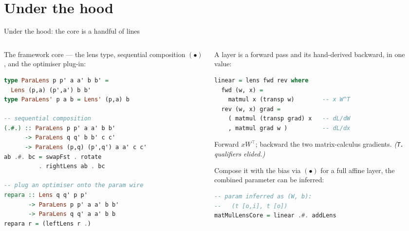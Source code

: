 \documentclass[aspectratio=169,11pt]{beamer}
\begin{document}
\section{Under the hood}

\begin{frame}[fragile]{Under the hood: the core is a handful of lines}
  \begin{columns}[T]
    \begin{column}{0.53\textwidth}
      \footnotesize The framework core --- the lens type, sequential composition $(\bullet)$, and the
      optimiser plug-in:
\begin{lstlisting}[language=hs,basicstyle=\ttfamily\scriptsize]
type ParaLens p p' a a' b b' = 
  Lens (p,a) (p',a') b b'
type ParaLens' p a b = Lens' (p,a) b

-- sequential composition
(.#.) :: ParaLens p p' a a' b b'
      -> ParaLens q q' b b' c c'
      -> ParaLens (p,q) (p',q') a a' c c'
ab .#. bc = swapFst . rotate
          . rightLens ab . bc

-- plug an optimiser onto the param wire
repara :: Lens q q' p p' 
       -> ParaLens p p' a a' b b' 
       -> ParaLens q q' a a' b b
repara r = (leftLens r .)
\end{lstlisting}
    \end{column}
    \begin{column}{0.47\textwidth}
      \footnotesize A layer is a forward pass and its hand-derived backward, in one value:
\begin{lstlisting}[language=hs,basicstyle=\ttfamily\scriptsize]
linear = lens fwd rev where
  fwd (w, x) =
    matmul x (transp w)        -- x W^T
  rev (w, x) grad =
    ( matmul (transp grad) x   -- dL/dW
    , matmul grad w )          -- dL/dx
\end{lstlisting}
      \scriptsize Forward $xW^\top$; backward the two matrix-calculus gradients. \textit{(\texttt{T.}
      qualifiers elided.)}

      \vspace{0.4em}
      \footnotesize Compose it with the bias via $(\bullet)$ for a full affine layer, the combined
      parameter can be inferred:
\begin{lstlisting}[language=hs,basicstyle=\ttfamily\scriptsize]
-- param inferred as (W, b):
--   (t [o,i], t [o])
matMulLensCore = linear .#. addLens
\end{lstlisting}
    \end{column}
  \end{columns}
\end{frame}
\end{document}
